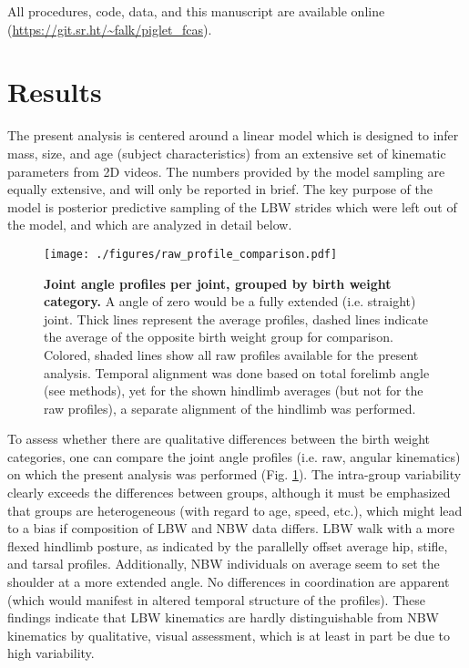 All procedures, code, data, and this manuscript are available online (\url{https://git.sr.ht/\~falk/piglet\_fcas}).

\FloatBarrier
\clearpage
\section{Results}
\label{results_22}
The present analysis is centered around a linear model which is designed to infer mass, size, and age (subject characteristics) from an extensive set of kinematic parameters from 2D videos.
The numbers provided by the model sampling are equally extensive, and will only be reported in brief.
The key purpose of the model is posterior predictive sampling of the LBW strides which were left out of the model, and which are analyzed in detail below.


\bigskip

\begin{figure}[p]
\centering
\texttt{[image: ./figures/raw\_profile\_comparison.pdf]}
\caption{\label{fig:raw_data}\textbf{Joint angle profiles per joint, grouped by birth weight category.} A  angle of zero would be a fully extended (i.e. straight) joint. Thick lines represent the average profiles, dashed lines indicate the average of the opposite birth weight group for comparison. Colored, shaded lines show all raw profiles available for the present analysis. Temporal alignment was done based on total forelimb angle (see methods), yet for the shown hindlimb averages (but not for the raw profiles), a separate alignment of the hindlimb was performed.}
\end{figure}

To assess whether there are qualitative differences between the birth weight categories, one can compare the joint angle profiles (i.e. raw, angular kinematics) on which the present analysis was performed (Fig. \ref{fig:raw_data}).
The intra-group variability clearly exceeds the differences between groups, although it must be emphasized that groups are heterogeneous (with regard to age, speed, etc.), which might lead to a bias if composition of LBW and NBW data differs.
LBW walk with a more flexed hindlimb posture, as indicated by the parallelly offset average hip, stifle, and tarsal profiles.
Additionally, NBW individuals on average seem to set the shoulder at a more extended  angle.
No differences in coordination are apparent (which would manifest in altered temporal structure of the profiles).
These findings indicate that LBW kinematics are hardly distinguishable from NBW kinematics by qualitative, visual assessment, which is at least in part be due to high variability.



